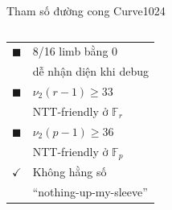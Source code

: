 \begin{frame}{Tham số đường cong Curve1024}
\begin{columns}[T]
      {\small
      \begin{tabular}{@{}l@{\;\;}l@{}}
        \textcolor{fitgreen}{$\blacksquare$} &
          8/16 limb bằng 0 \\
        & \footnotesize dễ nhận diện khi debug \\[6pt]
        \textcolor{red!70!black}{$\blacksquare$} &
          $\nu_2(r{-}1) \geq 33$ \\
        & \footnotesize NTT-friendly ở $\mathbb{F}_r$ \\[6pt]
        \textcolor{clrBlue600}{$\blacksquare$} &
          $\nu_2(p{-}1) \geq 36$ \\
        & \footnotesize NTT-friendly ở $\mathbb{F}_p$ \\[6pt]
        $\checkmark$ &
          Không hằng số \\
        & \footnotesize ``nothing-up-my-sleeve''
      \end{tabular}
      }
  \end{columns}
\end{frame}
